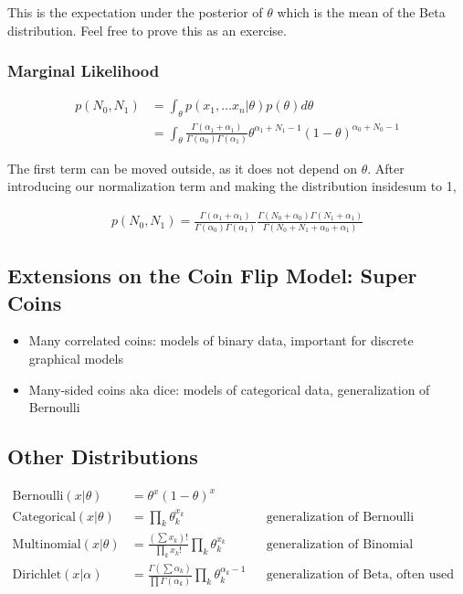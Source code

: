\documentclass{article}
\begin{document}
 \noindent This is the expectation under the posterior of $\theta$ which is the  mean of the Beta distribution. Feel free to prove this as an exercise. \\

\subsubsection*{Marginal Likelihood}

\begin{align*}
p(N_0, N_1) &= \int_\theta p(x_1, \hdots x_n | \theta) p(\theta) d\theta \\
&= \int_\theta \frac{\Gamma( \alpha_1 +  \alpha_1)}{\Gamma(\alpha_0)\Gamma(\alpha_1)} \theta^{\alpha_1 + N_1 -1} (1-\theta)^{\alpha_0+N_0-1}
\end{align*}

\noindent The first term can be moved outside, as it does not depend on $\theta$. After introducing our normalization term and making the distribution insidesum to 1,

\begin{align*}
p(N_0, N_1) = \frac{\Gamma( \alpha_1 +  \alpha_1)}{\Gamma(\alpha_0)\Gamma(\alpha_1)} \frac{\Gamma(N_0 + \alpha_0)\Gamma(N_1 + \alpha_1)}{\Gamma(N_0 + N_1 + \alpha_0 + \alpha_1)}
\end{align*}

\subsection{Extensions on the Coin Flip Model: Super Coins}
\begin{itemize}
\item Many correlated coins: models of binary data, important for discrete graphical models
\item Many-sided coins aka dice: models of categorical data, generalization of Bernoulli
\end{itemize}

\subsection{Other Distributions}

\begin{align*}
\textrm{Bernoulli}(x|\theta) &= \theta^{x}(1-\theta)^x \\
\textrm{Categorical}(x|\theta) &= \prod_k\theta_k^{x_k} && \text{generalization of Bernoulli} \\
\textrm{Multinomial}(x|\theta) &= \frac{(\sum x_k) !}{\prod_k x_k!}\prod_k\theta_k^{x_k} && \text{generalization of Binomial} \\
\textrm{Dirichlet}(x|\alpha) &= \frac{\Gamma(\sum \alpha_k)}{\prod \Gamma(\alpha_k)}\prod_k\theta_k^{\alpha_k-1} && \text{generalization of Beta, often used as a prior} \\
\end{align*}
\end{document}
